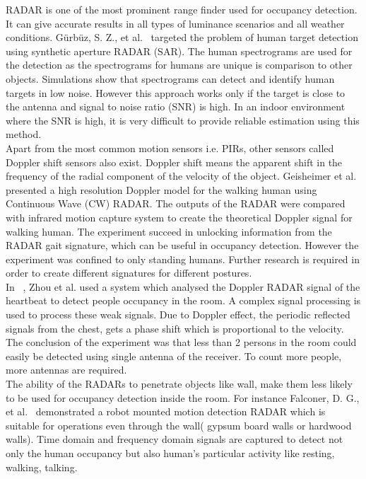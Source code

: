 
RADAR is one of the most prominent range finder used for occupancy detection. It can give accurate results in all types of luminance scenarios and all weather conditions.
G\"{u}rb\"{u}z, S. Z., et al.~\cite{gurbuz2007detection} targeted the problem of human target detection using synthetic aperture RADAR (SAR). The human spectrograms are used for the detection as the spectrograms for humans are unique is comparison to other objects. Simulations show that spectrograms can detect and identify human targets in low noise. However this approach works only if the target is close to the antenna and signal to noise ratio (SNR) is high. In an indoor environment where the SNR is high, it is very difficult to provide reliable estimation using this method.
\\

Apart from the most common motion sensors i.e. PIRs, other sensors called Doppler shift sensors also exist. Doppler shift means the apparent shift in the frequency of the radial component of the velocity of the object.
Geisheimer et al.~\cite{geisheimer2002high} presented a high resolution Doppler model for the walking human using Continuous Wave (CW) RADAR. The outputs of the RADAR were compared with infrared motion capture system to create the theoretical Doppler signal for walking human. The experiment succeed in unlocking information from the RADAR gait signature, which can be useful in occupancy detection. However the experiment was confined to only standing humans. Further research is required in order to create different signatures for different postures. 
\\

In ~\cite{zhou2006detection}, Zhou et al. used a system which analysed the Doppler RADAR signal of the heartbeat to detect people occupancy in the room. A complex signal processing is used to process these weak signals. Due to Doppler effect, the periodic reflected signals from the chest, gets a phase shift which is proportional to the velocity. The conclusion of the experiment was that less than 2 persons in the room could easily be detected using single antenna of the receiver. To count more people, more antennas are required. 
\\

The ability of the RADARs to penetrate objects like wall, make them less likely to be used for occupancy detection inside the room. For instance Falconer, D. G., et al.~\cite{falconer2000robot} demonstrated a robot mounted motion detection RADAR which is suitable for operations even through the wall( gypsum board walls or hardwood walls). Time domain and frequency domain signals are captured to detect not only the human occupancy but also human's particular activity like resting, walking, talking.



